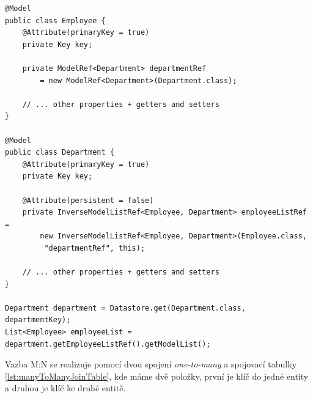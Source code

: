 \begin{lstlisting}[caption={Získání entit ze vztahu many-to-many},label=lst:unidirectionalManyToOneGetEntity,belowcaptionskip=0.4cm]
@Model
public class Employee {
	@Attribute(primaryKey = true)
	private Key key;	
	
	private ModelRef<Department> departmentRef 
		= new ModelRef<Department>(Department.class);
	
	// ... other properties + getters and setters
}

@Model
public class Department {
	@Attribute(primaryKey = true)
	private Key key;
	
	@Attribute(persistent = false)
	private InverseModelListRef<Employee, Department> employeeListRef =
		new InverseModelListRef<Employee, Department>(Employee.class,
		 "departmentRef", this);

	// ... other properties + getters and setters
}

Department department = Datastore.get(Department.class, departmentKey);
List<Employee> employeeList = department.getEmployeeListRef().getModelList();
\end{lstlisting}

Vazba M:N se realizuje pomocí dvou spojení \emph{one-to-many} a spojovací tabulky \ref{lst:manyToManyJoinTable}, kde máme dvě položky, první je klíč do jedné entity a druhou je klíč ke druhé entitě. 

